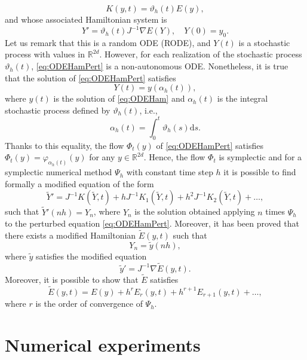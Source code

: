 \documentclass{siamart1116}
\numberwithin{theorem}{section}
\renewcommand{\phi}{\varphi}
\renewcommand{\theta}{\vartheta}
\newcommand{\R}{\mathbb{R}}
\newcommand{\dd}{\mathrm{d}}
\begin{document}
\begin{equation}
	K(y, t) = \theta_h(t)E(y),
\end{equation}
and whose associated Hamiltonian system is 
\begin{equation}\label{eq:ODEHamPert}
	Y' = \theta_h(t) J^{-1} \nabla E(Y), \quad Y(0) = y_0.
\end{equation}
Let us remark that this is a random ODE (RODE), and $Y(t)$ is a stochastic process with values in $\R^{2d}$. However, for each realization of the stochastic process $\theta_h(t)$, \eqref{eq:ODEHamPert} is a non-autonomous ODE. Nonetheless, it is true that the solution of \eqref{eq:ODEHamPert} satisfies 
\begin{equation}
	Y(t) = y(\alpha_h(t)),
\end{equation}
where $y(t)$ is the solution of \eqref{eq:ODEHam} and $\alpha_h(t)$ is the integral stochastic process defined by $\theta_h(t)$, i.e.,
\begin{equation}
	\alpha_h(t) = \int_{0}^{t} \theta_h(s) \dd s.
\end{equation}
Thanks to this equality, the flow $\Phi_t(y)$ of \eqref{eq:ODEHamPert} satisfies $\Phi_t(y) = \phi_{\alpha_h(t)}(y)$ for any $y \in \R^{2d}$. Hence, the flow $\Phi_t$ is symplectic and for a symplectic numerical method $\Psi_h$ with constant time step $h$ it is possible to find formally a modified equation of the form
\begin{equation}
	\tilde Y' = J^{-1}K(\tilde Y, t) + h J^{-1}K_1(\tilde Y, t) + h^2 J^{-1}K_2(\tilde Y, t) + \ldots,
\end{equation}
such that $\tilde Y'(nh) = Y_n$, where $Y_n$ is the solution obtained applying $n$ times $\Psi_h$ to the perturbed equation \eqref{eq:ODEHamPert}. Moreover, it has been proved \cite[Theorem 4]{Hai97} that there exists a modified Hamiltonian $\tilde E(y, t)$ such that
\begin{equation}
	Y_n = \tilde y(nh),
\end{equation}
where $\tilde y$ satisfies the modified equation
\begin{equation}
	\tilde y' = J^{-1} \nabla \tilde E(y, t).
\end{equation}
Moreover, it is possible to show that $\tilde E$ satisfies
\begin{equation}
	\tilde E(y, t) = E(y) + h^rE_r(y, t) + h^{r+1}E_{r+1}(y, t) + \ldots,
\end{equation}
where $r$ is the order of convergence of $\Psi_h$. 

\section{Numerical experiments}\label{sec:NumericalExperiments}
\end{document}
